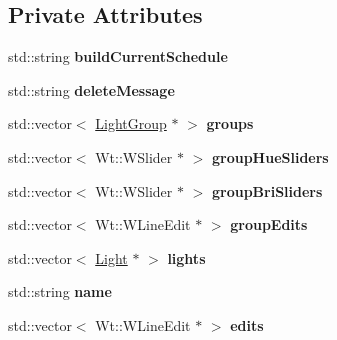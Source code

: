 \subsection*{Private Attributes}
\begin{DoxyCompactItemize}
\item 
\mbox{\label{class_home_page_ad43f4366a008051d3e1776092b1507fe}} 
std\+::string {\bfseries build\+Current\+Schedule}
\item 
\mbox{\label{class_home_page_a8d11f80cbf24a601b1f1b0c553f60f27}} 
std\+::string {\bfseries delete\+Message}
\item 
\mbox{\label{class_home_page_a3542f74573ce071ee708cdd64a09cbb4}} 
std\+::vector$<$ \hyperlink{class_light_group}{Light\+Group} $\ast$ $>$ {\bfseries groups}
\item 
\mbox{\label{class_home_page_ade2a3d058ec4513037bd3019637b4244}} 
std\+::vector$<$ Wt\+::\+W\+Slider $\ast$ $>$ {\bfseries group\+Hue\+Sliders}
\item 
\mbox{\label{class_home_page_ab8b2900ac658e931740f3cb88adbf3f6}} 
std\+::vector$<$ Wt\+::\+W\+Slider $\ast$ $>$ {\bfseries group\+Bri\+Sliders}
\item 
\mbox{\label{class_home_page_a3ba52a08e34248ec5c27b09c99d152f1}} 
std\+::vector$<$ Wt\+::\+W\+Line\+Edit $\ast$ $>$ {\bfseries group\+Edits}
\item 
\mbox{\label{class_home_page_a83b6a751af68810ab593a87bde1df58e}} 
std\+::vector$<$ \hyperlink{class_light}{Light} $\ast$ $>$ {\bfseries lights}
\item 
\mbox{\label{class_home_page_ae86e2fca3964ce3e323ad73c2976882c}} 
std\+::string {\bfseries name}
\item 
\mbox{\label{class_home_page_a49058000209f6fcf1c3dae010314ab31}} 
std\+::vector$<$ Wt\+::\+W\+Line\+Edit $\ast$ $>$ {\bfseries edits}
\item 
\mbox{\label{class_home_page_aff6c1a9092c37bdae536761ee1ab6305}} 

\end{DoxyCompactItemize}
